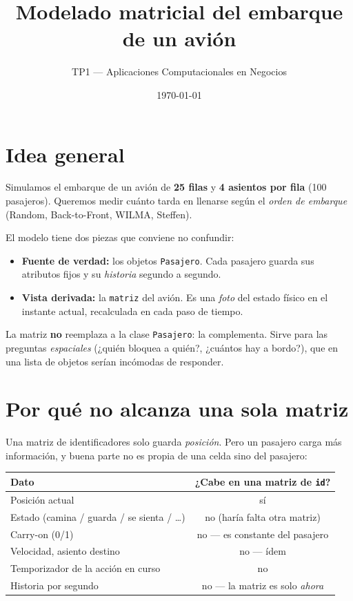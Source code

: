 \documentclass[11pt,a4paper]{article}
\title{\textbf{Modelado matricial del embarque de un avión}}
\author{TP1 --- Aplicaciones Computacionales en Negocios}
\date{\today}
\begin{document}
\maketitle

\section{Idea general}

Simulamos el embarque de un avión de \textbf{25 filas} y \textbf{4 asientos por fila}
(100 pasajeros). Queremos medir cuánto tarda en llenarse según el \emph{orden de embarque}
(Random, Back-to-Front, WILMA, Steffen).

El modelo tiene dos piezas que conviene no confundir:

\begin{itemize}[leftmargin=1.4em]
  \item \textbf{Fuente de verdad:} los objetos \texttt{Pasajero}. Cada pasajero guarda
        sus atributos fijos y su \emph{historia} segundo a segundo.
  \item \textbf{Vista derivada:} la \texttt{matriz} del avión. Es una \emph{foto} del estado
        físico en el instante actual, recalculada en cada paso de tiempo.
\end{itemize}

La matriz \textbf{no} reemplaza a la clase \texttt{Pasajero}: la complementa. Sirve para
las preguntas \emph{espaciales} (¿quién bloquea a quién?, ¿cuántos hay a bordo?), que en
una lista de objetos serían incómodas de responder.

\section{Por qué no alcanza una sola matriz}

Una matriz de identificadores solo guarda \emph{posición}. Pero un pasajero carga más
información, y buena parte no es propia de una celda sino del pasajero:

\begin{center}
\begin{tabular}{l c}
\toprule
\textbf{Dato} & \textbf{¿Cabe en una matriz de \texttt{id}?} \\
\midrule
Posición actual & sí \\
Estado (camina / guarda / se sienta / \dots) & no (haría falta otra matriz) \\
Carry-on (0/1) & no --- es constante del pasajero \\
Velocidad, asiento destino & no --- ídem \\
Temporizador de la acción en curso & no \\
Historia por segundo & no --- la matriz es solo \emph{ahora} \\
\bottomrule
\end{tabular}
\end{center}
\end{document}
